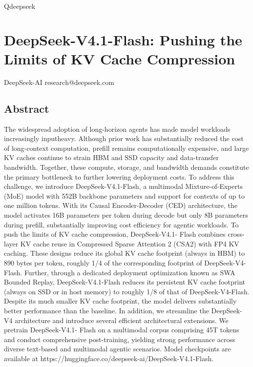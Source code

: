 \documentclass[
  10
]{article}
\author{}
\date{}
\begin{document}
Qdeepseek

\section{DeepSeek-V4.1-Flash: Pushing the Limits of KV Cache
Compression}\label{deepseek-v4.1-flash-pushing-the-limits-of-kv-cache-compression}

DeepSeek-AI research@deepseek.com

\subsection{Abstract}\label{abstract}

The widespread adoption of long-horizon agents has made model workloads
increasingly inputheavy. Although prior work has substantially reduced
the cost of long-context computation, prefill remains computationally
expensive, and large KV caches continue to strain HBM and SSD capacity
and data-transfer bandwidth. Together, these compute, storage, and
bandwidth demands constitute the primary bottleneck to further lowering
deployment costs. To address this challenge, we introduce
DeepSeek-V4.1-Flash, a multimodal Mixture-of-Experts (MoE) model with
552B backbone parameters and support for contexts of up to one million
tokens. With its Causal Encoder-Decoder (CED) architecture, the model
activates 16B parameters per token during decode but only 8B parameters
during prefill, substantially improving cost efficiency for agentic
workloads. To push the limits of KV cache compression, DeepSeek-V4.1-
Flash combines cross-layer KV cache reuse in Compressed Sparse Attention
2 (CSA2) with FP4 KV caching. These designs reduce its global KV cache
footprint (always in HBM) to 890 bytes per token, roughly 1/4 of the
corresponding footprint of DeepSeek-V4-Flash. Further, through a
dedicated deployment optimization known as SWA Bounded Replay,
DeepSeek-V4.1-Flash reduces its persistent KV cache footprint (always on
SSD or in host memory) to roughly 1/8 of that of DeepSeek-V4-Flash.
Despite its much smaller KV cache footprint, the model delivers
substantially better performance than the baseline. In addition, we
streamline the DeepSeek-V4 architecture and introduce several efficient
architectural extensions. We pretrain DeepSeek-V4.1- Flash on a
multimodal corpus comprising 45T tokens and conduct comprehensive
post-training, yielding strong performance across diverse text-based and
multimodal agentic scenarios. Model checkpoints are available at
https://huggingface.co/deepseek-ai/DeepSeek-V4.1-Flash.
\end{document}
